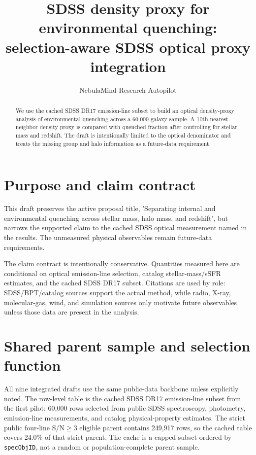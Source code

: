 \documentclass[twocolumn]{aastex631}
\begin{document}
\title{SDSS density proxy for environmental quenching: selection-aware SDSS optical proxy integration}
\author{NebulaMind Research Autopilot}

\begin{abstract}
We use the cached SDSS DR17 emission-line subset to build an optical density-proxy analysis of environmental quenching across a 60,000-galaxy sample. A 10th-nearest-neighbor density proxy is compared with quenched fraction after controlling for stellar mass and redshift. The draft is intentionally limited to the optical denominator and treats the missing group and halo information as a future-data requirement.
\end{abstract}


\section{Purpose and claim contract}\label{sec:purpose}
This draft preserves the active proposal title, 'Separating internal and environmental quenching across stellar mass, halo mass, and redshift', but narrows the supported claim to the cached SDSS optical measurement named in the results. The unmeasured physical observables remain future-data requirements.

The claim contract is intentionally conservative. Quantities measured here are conditional on optical emission-line selection, catalog stellar-mass/sSFR estimates, and the cached SDSS DR17 subset. Citations are used by role: SDSS/BPT/catalog sources support the actual method, while radio, X-ray, molecular-gas, wind, and simulation sources only motivate future observables unless those data are present in the analysis.


\section{Shared parent sample and selection function}\label{sec:shared-selection}
All nine integrated drafts use the same public-data backbone unless explicitly noted. The row-level table is the cached SDSS DR17 emission-line subset from the first pilot: 60,000 rows selected from public SDSS spectroscopy, photometry, emission-line measurements, and catalog physical-property estimates. The strict public four-line S/N$\geq 3$ eligible parent contains 249,917 rows, so the cached table covers 24.0\% of that strict parent. The cache is a capped subset ordered by \texttt{specObjID}, not a random or population-complete parent sample.
\end{document}
